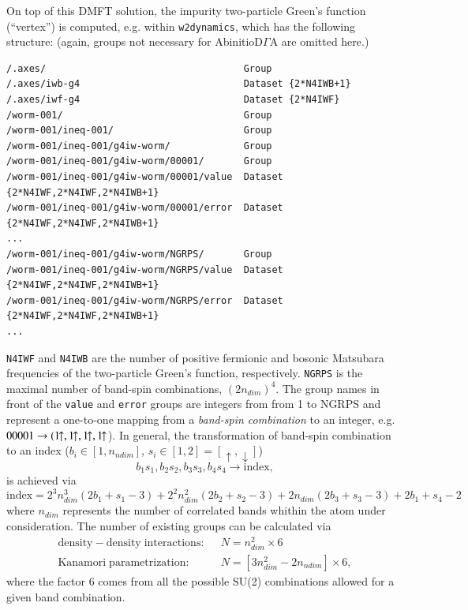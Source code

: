 \documentclass[a4paper,11pt]{article}
\numberwithin{equation}{section} %
\begin{document}
On top of this DMFT solution, the impurity two-particle Green's function (``vertex'') is computed, e.g. within \verb|w2dynamics|,
which has the following structure: (again, groups not necessary for AbinitioD$\Gamma$A
are omitted here.)
\begin{lstlisting}[caption=HDF5-structure of the worm-sampled vertex, frame=single, basicstyle=\small, label={lst:dmft2}]
/.axes/                                   Group
/.axes/iwb-g4                             Dataset {2*N4IWB+1}
/.axes/iwf-g4                             Dataset {2*N4IWF}
/worm-001/                                Group
/worm-001/ineq-001/                       Group
/worm-001/ineq-001/g4iw-worm/             Group
/worm-001/ineq-001/g4iw-worm/00001/       Group
/worm-001/ineq-001/g4iw-worm/00001/value  Dataset {2*N4IWF,2*N4IWF,2*N4IWB+1}
/worm-001/ineq-001/g4iw-worm/00001/error  Dataset {2*N4IWF,2*N4IWF,2*N4IWB+1}
...
/worm-001/ineq-001/g4iw-worm/NGRPS/       Group
/worm-001/ineq-001/g4iw-worm/NGRPS/value  Dataset {2*N4IWF,2*N4IWF,2*N4IWB+1}
/worm-001/ineq-001/g4iw-worm/NGRPS/error  Dataset {2*N4IWF,2*N4IWF,2*N4IWB+1}
...
\end{lstlisting}
\verb|N4IWF| and \verb|N4IWB| are the number of positive fermionic and bosonic Matsubara frequencies of the
two-particle Green's function, respectively. \verb|NGRPS| is the maximal number of band-spin combinations, $(2n_{dim})^4$.
The group names in front of the \verb|value| and \verb|error| groups are integers
from from 1 to NGRPS and represent a one-to-one mapping from a \emph{band-spin combination}
to an integer, e.g.~$00001 \rightarrow (1\hspace{-4pt}\uparrow, 1\hspace{-4pt}\uparrow, 1\hspace{-4pt}\uparrow, 1\hspace{-4pt}\uparrow$).
In general, the transformation of band-spin combination to an index ($b_i \in [1,n_{ndim}]$, $s_i \in [1,2] = [\uparrow, \downarrow]$)
\begin{equation*}
b_1 s_1,b_2 s_2, b_3 s_3, b_4s_4 \rightarrow \mathrm{index},
\end{equation*}
is achieved via
\begin{equation*}
\mathrm{index} = 2^3 n_{dim}^3(2 b_1+s_1-3) + 2^2 n_{dim}^2(2 b_2+s_2-3) + 2 n_{dim}(2 b_3+s_3-3) + 2 b_1 + s_4 - 2
\end{equation*}
where $n_{dim}$ represents the number of correlated bands whithin the atom under consideration.
The number of existing groups can be calculated via
\begin{equation*}
\begin{aligned}
\mathrm{density-density\;interactions: }&\;\; N = n_{dim}^2 \times 6 \\
\mathrm{Kanamori\;parametrization: }&\;\; N = \left[3n_{dim}^2 - 2n_{ndim}\right] \times 6,
\end{aligned}
\end{equation*}
where the factor $6$ comes from all the possible SU(2) combinations allowed for a given band combination.
\end{document}
